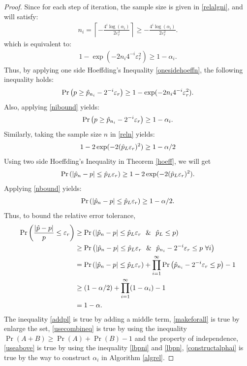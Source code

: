\documentclass{iitthesis}
\theoremstyle{definition}
\begin{document}
\begin{proof}
Since for each step of iteration, the sample size is given in \eqref{relalgni}, and will satisfy:
\begin{align*}
n_i = \left \lceil -\frac{4^i \log(\alpha_i)} {2\varepsilon_r^2 } \right\rceil \geq -\frac{4^i \log(\alpha_i)} {2\varepsilon_r^2 }.
 \end{align*}
 which is equivalent to:
\begin{align}\label{nibound}
1- \exp(-2n_i4^{-i}\varepsilon_r^2) \geq 1-\alpha_i.
\end{align}
 Thus, by applying one side Hoeffding's Inequality \eqref{onesidehoeffn}, the following inequality holds:
 \begin{align*} 
\Pr\left(p \geq \hat{p}_{n_i}-2^{-i}\varepsilon_r  \right) \geq 1- \exp(-2n_i4^{-i}\varepsilon_r^2).
 \end{align*} 
Also, applying \eqref{nibound} yields:
 \begin{align} \label{lbpni}
 \Pr\left(p \geq \hat{p}_{n_i}-2^{-i}\varepsilon_r \right) \geq 1-\alpha_i.
 \end{align}
Similarly, taking the sample size $n$ in \eqref{reln} yields:
\begin{align}\label{nbound}
1-2\exp(-2  (\hat{p}_L\varepsilon_{r})^2) \geq 1-\alpha/2
\end{align}
 Using two side Hoeffding's Inequality in Theorem \ref{hoeff}, we will get
\begin{align}
 \Pr \left( \left|{\hat{p}_n - p}\right| \leq \hat{p}_L \varepsilon_r \right ) \geq  1-2\exp(-2  (\hat{p}_L\varepsilon_{r})^2).
 \end{align}
 Applying \eqref{nbound} yields:
 \begin{align}\label{lbpn}
  \Pr \left( \left|{\hat{p}_n - p}\right| \leq \hat{p}_L \varepsilon_r \right ) \geq 1-\alpha/2.
 \end{align}
 Thus, to bound the relative error tolerance,
\begin{align}
 \Pr \left ( \frac{\abs{\hp - p}}{p} \leq \varepsilon_r\right ) & \geq \Pr \left ( \abs{\hp_n - p} \leq \hp_L\varepsilon_r \ \ \& \ \   \hp_L \leq p \right ) \label{addpl}\\&
 \geq \Pr \left( \abs{\hp_n - p} \leq \hp_L \varepsilon_r \ \  \& \ \  \hp_{n_i} - 2^{-i}\varepsilon_r \leq p\  \forall i   \right) \label{makeforall}\\&
  = \Pr\left ( \abs{\hp_n - p} \leq \hp_L \varepsilon_r \right)+ \prod_{i = 1}^\infty \Pr \left(\hp_{n_i} - 2^{-i}\varepsilon_r  \leq p \right)-1\label{usecombineq} \\&
\geq (1-\alpha/2)+\prod_{i=1}^\infty(1-\alpha_i)-1 \label{useabove} \\&
 = 1-\alpha \label{constructalphai}.
\end{align}
The inequality \eqref{addpl} is true by adding a middle term, \eqref{makeforall} is true by enlarge the set, \eqref{usecombineq} is true by using the inequality $\Pr(A+B)\geq\Pr(A)+\Pr(B)-1$ and the property of independence, \eqref{useabove} is true by using the inequality \eqref{lbpni} and \eqref{lbpn}, \eqref{constructalphai} is true by the way to construct $\alpha_i$ in Algorithm \ref{algrel}.
\end{proof}
\end{document}

